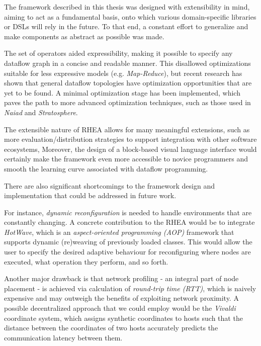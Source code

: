 \documentclass[sigplan,review,anonymous]{acmart}
\begin{document}
The framework described in this thesis was designed with extensibility in mind,
aiming to act as a fundamental basis, onto which various domain-specific
libraries or DSLs will rely in the future. To that end, a constant effort to
generalize and make components as abstract as possible was made.

The set of operators aided expressibility, making it possible to specify any
dataflow graph in a concise and readable manner. This disallowed optimizations
suitable for less expressive models (e.g. \textit{Map-Reduce}), but recent
research has shown that general dataflow topologies have optimization
opportunities that are yet to be found\cite{blackbox}. A minimal optimization
stage has been implemented, which paves the path to more advanced optimization
techniques, such as those used in \textit{Naiad}\cite{naiad} and
\textit{Stratosphere}\cite{static_analysis}.

The extensible nature of \textsc{RHEA} allows for many meaningful extensions, such as
more evaluation/distribution strategies to support integration with other software ecosystems,
Moreover, the design of a block-based visual language interface would certainly make the
framework even more accessible to novice programmers and smooth the learning curve
associated with dataflow programming.

There are also significant shortcomings to the framework design and implementation that
could be addressed in future work.

For instance, \textit{dynamic reconfiguration} is needed to handle environments that are constantly changing.
A concrete contribution to the \textsc{RHEA} would be to integrate \textit{HotWave}\cite{reconf_java},
which is an \textit{aspect-oriented programming (AOP)} framework that supports dynamic
(re)weaving of previously loaded classes. This would allow the user to specify the desired
adaptive behaviour for reconfiguring where nodes are executed, what operation they perform, and so forth.

Another major drawback is that network profiling - an integral part of node placement - is achieved via
calculation of \textit{round-trip time (RTT)}, which is naively expensive and may outweigh the benefits of
exploiting network proximity. A possible decentralized approach that we could employ would be the \textit{Vivaldi}
coordinate system\cite{vivaldi}, which assigns synthetic coordinates to hosts
such that the distance between the coordinates of two hosts accurately predicts
the communication latency between them.
\end{document}
